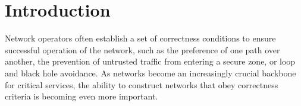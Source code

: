 \section{Introduction}
\label{sec:intro}



Network operators often establish a set of correctness conditions to ensure 
successful operation of the network, such as
the preference of one path over another, the prevention of untrusted traffic
from entering a secure zone,
or loop and black hole avoidance. As networks become an increasingly crucial backbone for
critical services,
the ability to construct networks that obey correctness criteria is becoming
even more important. 

